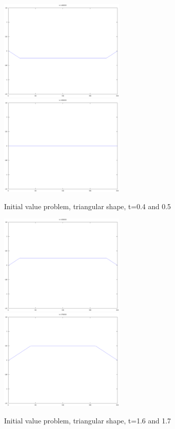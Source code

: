\documentclass[a4paper,10pt]{report}
\begin{document}
\begin{figure}
 \includegraphics[width=6cm]{./fixed_ends_analytic_t1.400000.eps}
\includegraphics[width=6cm]{./fixed_ends_analytic_t1.500000.eps}

\caption{Initial value problem, triangular shape, t=0.4 and 0.5}
\end{figure} 

\begin{figure}
 \includegraphics[width=6cm]{./fixed_ends_analytic_t1.600000.eps}
\includegraphics[width=6cm]{./fixed_ends_analytic_t1.700000.eps}

\caption{Initial value problem, triangular shape, t=1.6 and 1.7}
\end{figure} 
\end{document}
